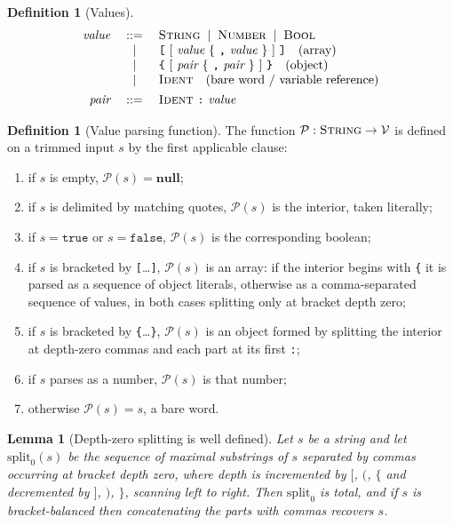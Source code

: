 \documentclass[11pt,twocolumn,a4paper]{article}
\theoremstyle{ssthm}
\newtheorem{lemma}[theorem]{Lemma}
\theoremstyle{definition}
\newtheorem{definition}[theorem]{Definition}
\theoremstyle{remark}
\newcommand{\bnf}{\;::=\;}
\newcommand{\alt}{\;\mid\;}
\newcommand{\shk}[1]{\texttt{#1}}
\newcommand{\Vals}{\mathcal{V}}
\begin{document}
\begin{definition}[Values]
\label{def:values}
\[
\begin{array}{rcl}
\textit{value} &\bnf& \textsc{String} \alt \textsc{Number} \alt \textsc{Bool}\\
               &\alt& \shk{[}\ [\ \textit{value}\ \{\ \shk{,}\ \textit{value}\ \}\ ]\ \shk{]}
                      \quad\text{(array)}\\
               &\alt& \shk{\{}\ [\ \textit{pair}\ \{\ \shk{,}\ \textit{pair}\ \}\ ]\ \shk{\}}
                      \quad\text{(object)}\\
               &\alt& \textsc{Ident} \quad\text{(bare word / variable reference)}\\[4pt]
\textit{pair}  &\bnf& \textsc{Ident}\ \shk{:}\ \textit{value}
\end{array}
\]
\end{definition}

\begin{definition}[Value parsing function]
\label{def:parseval}
The function $\mathcal{P}:\textsc{String}\to\Vals$ is defined on a
trimmed input $s$ by the first applicable clause:
\begin{enumerate}[label=(V\arabic*),leftmargin=2.6em,itemsep=1pt]
\item if $s$ is empty, $\mathcal{P}(s)=\mathbf{null}$;
\item if $s$ is delimited by matching quotes, $\mathcal{P}(s)$ is the
      interior, taken literally;
\item if $s=\shk{true}$ or $s=\shk{false}$, $\mathcal{P}(s)$ is the
      corresponding boolean;
\item if $s$ is bracketed by \shk{[}\dots\shk{]}, $\mathcal{P}(s)$ is an
      array: if the interior begins with \shk{\{} it is parsed as a
      sequence of object literals, otherwise as a comma-separated
      sequence of values, in both cases splitting only at bracket depth
      zero;
\item if $s$ is bracketed by \shk{\{}\dots\shk{\}}, $\mathcal{P}(s)$ is an
      object formed by splitting the interior at depth-zero commas and
      each part at its first \shk{:};
\item if $s$ parses as a number, $\mathcal{P}(s)$ is that number;
\item otherwise $\mathcal{P}(s)=s$, a bare word.
\end{enumerate}
\end{definition}

\begin{lemma}[Depth-zero splitting is well defined]
\label{lem:split}
Let $s$ be a string and let $\mathrm{split}_0(s)$ be the sequence of
maximal substrings of $s$ separated by commas occurring at bracket depth
zero, where depth is incremented by $\shk{[}$, $\shk{(}$, $\shk{\{}$ and
decremented by $\shk{]}$, $\shk{)}$, $\shk{\}}$, scanning left to right.
Then $\mathrm{split}_0$ is total, and if $s$ is bracket-balanced then
concatenating the parts with commas recovers $s$.
\end{lemma}
\end{document}
